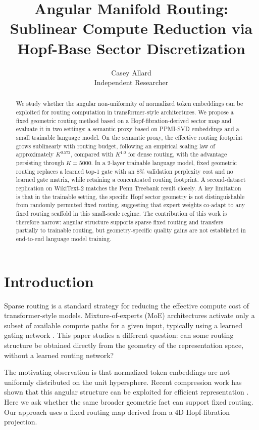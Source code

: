 \documentclass[10pt,twocolumn]{article}
\title{Angular Manifold Routing: Sublinear Compute Reduction via Hopf-Base Sector Discretization}
\author{Casey Allard\\Independent Researcher}
\date{}
\begin{document}
\maketitle

\begin{abstract}
We study whether the angular non-uniformity of normalized token embeddings can be exploited for routing computation in transformer-style architectures. We propose a fixed geometric routing method based on a Hopf-fibration-derived sector map and evaluate it in two settings: a semantic proxy based on PPMI-SVD embeddings and a small trainable language model. On the semantic proxy, the effective routing footprint grows sublinearly with routing budget, following an empirical scaling law of approximately $K^{0.572}$, compared with $K^{1.0}$ for dense routing, with the advantage persisting through $K=5000$. In a 2-layer trainable language model, fixed geometric routing replaces a learned top-1 gate with an 8\% validation perplexity cost and no learned gate matrix, while retaining a concentrated routing footprint. A second-dataset replication on WikiText-2 matches the Penn Treebank result closely. A key limitation is that in the trainable setting, the specific Hopf sector geometry is not distinguishable from randomly permuted fixed routing, suggesting that expert weights co-adapt to any fixed routing scaffold in this small-scale regime. The contribution of this work is therefore narrow: angular structure supports sparse fixed routing and transfers partially to trainable routing, but geometry-specific quality gains are not established in end-to-end language model training.
\end{abstract}

\section{Introduction}
Sparse routing is a standard strategy for reducing the effective compute cost of transformer-style models. Mixture-of-experts (MoE) architectures activate only a subset of available compute paths for a given input, typically using a learned gating network \citep{shazeer2017outrageously,fedus2022switch}. This paper studies a different question: can some routing structure be obtained directly from the geometry of the representation space, without a learned routing network?

The motivating observation is that normalized token embeddings are not uniformly distributed on the unit hypersphere. Recent compression work has shown that this angular structure can be exploited for efficient representation \citep{turboquant2026}. Here we ask whether the same broader geometric fact can support fixed routing. Our approach uses a fixed routing map derived from a 4D Hopf-fibration projection.
\end{document}
